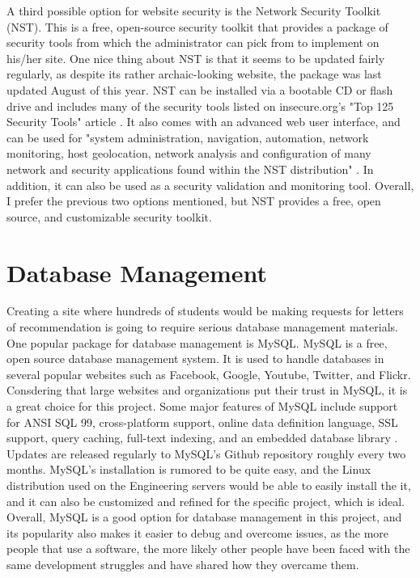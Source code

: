 \documentclass[letterpaper, 10pt, draftclsnofoot,onecolumn]{IEEEtran}
\begin{document}
A third possible option for website security is the Network Security Toolkit (NST). This is a free, open-source security toolkit that provides a package of security tools from which the administrator can pick from to implement on his/her site. One nice thing about NST is that it seems to be updated fairly regularly, as despite its rather archaic-looking website, the package was last updated August of this year. NST can be installed via a bootable CD or flash drive and includes many of the security tools listed on insecure.org's "Top 125 Security Tools" article \cite{NST}. It also comes with an advanced web user interface, and can be used for "system administration, navigation, automation, network monitoring, host geolocation, network analysis and configuration of many network and security applications found within the NST distribution" \cite{NST}. In addition, it can also be used as a security validation and monitoring tool. Overall, I prefer the previous two options mentioned, but NST provides a free, open source, and customizable security toolkit.

\section{Database Management}
Creating a site where hundreds of students would be making requests for letters of recommendation is going to require serious database management materials. One popular package for database management is MySQL. MySQL is a free, open source database management system. It is used to handle databases in several popular websites such as Facebook, Google, Youtube, Twitter, and Flickr. Consdering that large websites and organizations put their trust in MySQL, it is a great choice for this project. Some major features of MySQL include support for ANSI SQL 99, cross-platform support, online data definition language, SSL support, query caching, full-text indexing, and an embedded database library \cite{MySQL}. Updates are released regularly to MySQL's Github repository roughly every two months. MySQL's installation is rumored to be quite easy, and the Linux distribution used on the Engineering servers would be able to easily install the it, and it can also be customized and refined for the specific project, which is ideal. Overall, MySQL is a good option for database management in this project, and its popularity also makes it easier to debug and overcome issues, as the more people that use a software, the more likely other people have been faced with the same development struggles and have shared how they overcame them.
\end{document}
